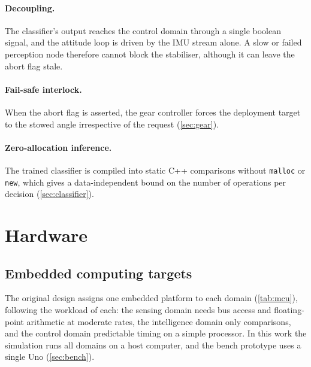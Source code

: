 \documentclass[11pt,a4paper]{article}
\DeclareRobustCommand{\code}[1]{{\let\_\codeus\texttt{#1}}}
\newcommand{\codeus}{\textunderscore\allowbreak{}}
\begin{document}
\paragraph{Decoupling.} The classifier's output reaches the control domain through a single boolean signal, and the attitude loop is driven by the IMU stream alone. A slow or failed perception node therefore cannot block the stabiliser, although it can leave the abort flag stale.
 
\paragraph{Fail-safe interlock.} When the abort flag is asserted, the gear controller forces the deployment target to the stowed angle irrespective of the request (\cref{sec:gear}).
 
\paragraph{Zero-allocation inference.} The trained classifier is compiled into static C++ comparisons without \code{malloc} or \code{new}, which gives a data-independent bound on the number of operations per decision (\cref{sec:classifier}).
 
\section{Hardware}\label{sec:hw}
 
\subsection{Embedded computing targets}
The original design assigns one embedded platform to each domain (\cref{tab:mcu}), following the workload of each: the sensing domain needs bus access and floating-point arithmetic at moderate rates, the intelligence domain only comparisons, and the control domain predictable timing on a simple processor. In this work the simulation runs all domains on a host computer, and the bench prototype uses a single Uno (\cref{sec:bench}).
 
\end{document}
